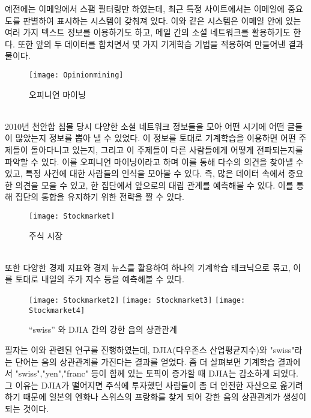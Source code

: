 \documentclass[a4paper]{oblivoir}
\begin{document}
\indent 예전에는 이메일에서 스팸 필터링만 하였는데, 최근 특정 사이트에서는 이메일에 중요도를 판별하여 표시하는 시스템이 갖춰져 있다. 이와 같은 시스템은 이메일 안에 있는 여러 가지 텍스트 정보를 이용하기도 하고, 메일 간의 소셜 네트워크를 활용하기도 한다. 또한 앞의 두 데이터를 합치면서 몇 가지 기계학습 기법을 적용하여 만들어낸 결과물이다.\\
\begin{figure}[ht]\centering
\texttt{[image: Opinionmining]}\caption{오피니언 마이닝}\label{Fig:1-10}
\end{figure}\\
\indent 2010년 천안함 침몰 당시 다양한 소셜 네트워크 정보들을 모아 어떤 시기에 어떤 글들이 많았는지 정보를 뽑아 낼 수 있었다. 이 정보를 토대로 기계학습을 이용하면 어떤 주제들이 돌아다니고 있는지, 그리고 이 주제들이 다른 사람들에게 어떻게 전파되는지를 파악할 수 있다. 이를 오피니언 마이닝이라고 하며 이를 통해 다수의 의견을 찾아낼 수 있고,  특정 사건에 대한 사람들의 인식을 모아볼 수 있다. 즉, 많은 데이터 속에서 중요한 의견을 모을 수 있고, 한 집단에서 앞으로의 대립 관계를 예측해볼 수 있다. 이를 통해 집단의 통합을 유지하기 위한 전략을 짤 수 있다.\\
\begin{figure}[ht]\centering
\texttt{[image: Stockmarket]}\caption{주식 시장}\label{Fig:1-11}
\end{figure}\\
\indent 또한 다양한 경제 지표와 경제 뉴스를 활용하여 하나의 기계학습 테크닉으로 묶고, 이를 토대로 내일의 주가 지수 등을 예측해볼 수 있다.
\begin{figure}[ht]\centering
\texttt{[image: Stockmarket2]}\label{Fig:1-12}
\texttt{[image: Stockmarket3]}\label{Fig:1-13}
\texttt{[image: Stockmarket4]}\label{Fig:1-14}
\caption{“swiss” 와 DJIA 간의 강한 음의 상관관계}
\end{figure}
필자는 이와 관련된 연구를 진행하였는데, DJIA(다우존스 산업평균지수)와 "swiss"라는 단어는 음의 상관관계를 가진다는 결과를 얻었다. 좀 더 살펴보면 기계학습 결과에서  "swiss","yen","franc" 등이 함께 있는 토픽이 증가할 때 DJIA는 감소하게 되었다. 그 이유는 DJIA가 떨어지면 주식에 투자했던 사람들이 좀 더 안전한 자산으로 옮기려 하기 때문에 일본의 엔화나 스위스의 프랑화를 찾게 되어 강한 음의 상관관계가 생성이 되는 것이다.
\end{document}
